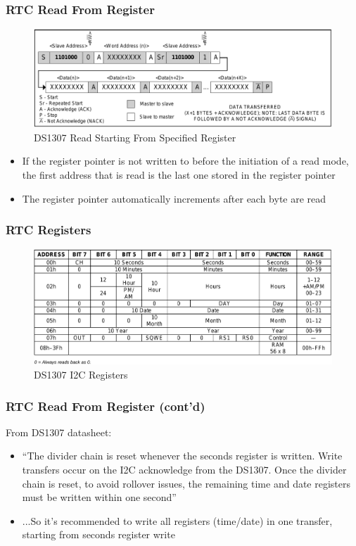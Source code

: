 \documentclass[aspectratio=169,usenames,dvipsnames]{beamer}
\newcounter{cont}
\begin{document}
\begin{frame}
  \frametitle{RTC Read From Register}
  \begin{figure}
    \centering
    \includegraphics[scale=0.35]{images/ds1307-read-reg.png}
    \caption{DS1307 Read Starting From Specified Register}
  \end{figure}
  \vspace*{-5mm}
  \begin{itemize}
    \item If the register pointer is not written to before the initiation of a
          read mode, the first address that is read is the last one stored in
          the register pointer
    \item The register pointer automatically increments after each byte are read
  \end{itemize}
\end{frame}

\begin{frame}
  \frametitle{RTC Registers}
  \begin{figure}
    \centering
    \includegraphics[scale=0.3]{images/rtc-registers.png}
    \caption{DS1307 I2C Registers}
  \end{figure}
\end{frame}

\begin{frame}
  \frametitle{RTC Read From Register (cont'd)}
  From DS1307 datasheet:
  \begin{itemize}
    \item ``The divider chain is reset whenever the seconds register is written. Write transfers
occur on the I2C acknowledge from the DS1307. Once the divider chain is reset,
to avoid rollover issues, the remaining time and date registers must be written within one second''
    \item ...So it's recommended to write all registers (time/date) in one transfer, starting from seconds register write
  \end{itemize}
\end{frame}
\end{document}
